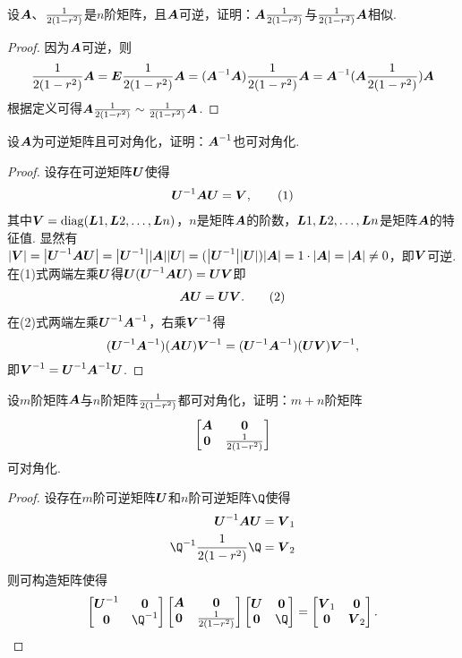 \begin{example}
设\(\boldsymbol{A}\)、\(\frac{1}{2(1-r^2)}\)是\(n\)阶矩阵，且\(\boldsymbol{A}\)可逆，证明：\(\boldsymbol{A}\frac{1}{2(1-r^2)}\)与\(\frac{1}{2(1-r^2)}\boldsymbol{A}\)相似.
\begin{proof}
因为\(\boldsymbol{A}\)可逆，则\[
\frac{1}{2(1-r^2)}\boldsymbol{A}
=\boldsymbol{E}\frac{1}{2(1-r^2)}\boldsymbol{A}
=(\boldsymbol{A}^{-1}\boldsymbol{A})\frac{1}{2(1-r^2)}\boldsymbol{A}
=\boldsymbol{A}^{-1}(\boldsymbol{A}\frac{1}{2(1-r^2)})\boldsymbol{A}
\]根据定义可得\(\boldsymbol{A}\frac{1}{2(1-r^2)} \sim \frac{1}{2(1-r^2)}\boldsymbol{A}\).
\end{proof}
\end{example}

\begin{example}
设\(\boldsymbol{A}\)为可逆矩阵且可对角化，证明：\(\boldsymbol{A}^{-1}\)也可对角化.
\begin{proof}
设存在可逆矩阵\(\P\)使得\begin{gather}
\P^{-1}\A\P = \V, \tag1
\end{gather}其中\(\boldsymbol{V}=\operatorname{diag}(\boldsymbol{L}{1},\boldsymbol{L}{2},\dotsc,\boldsymbol{L}{n})\)，\(n\)是矩阵\(\boldsymbol{A}\)的阶数，\(\boldsymbol{L}{1},\boldsymbol{L}{2},\dotsc,\boldsymbol{L}{n}\)是矩阵\(\boldsymbol{A}\)的特征值.
显然有\(\abs{\V} = \abs{\P^{-1}\A\P} = \abs{\P^{-1}}\abs{\A}\abs{\P} = (\abs{\P^{-1}}\abs{\P})\abs{\A} = 1 \cdot \abs{\A} = \abs{\A} \neq 0\)，即\(\boldsymbol{V}\)可逆.
在(1)式两端左乘\(\P\)得\(\P(\P^{-1}\A\P) = \P\V\)即\begin{gather}
\A\P = \P\V. \tag2
\end{gather}
在(2)式两端左乘\(\P^{-1}\A^{-1}\)，右乘\(\boldsymbol{V}^{-1}\)得\[
(\P^{-1}\A^{-1})(\A\P)\V^{-1} = (\P^{-1}\A^{-1})(\P\V)\V^{-1},
\]即\(\V^{-1} = \P^{-1}\A^{-1}\P\).
\end{proof}
\end{example}

\begin{example}
设\(m\)阶矩阵\(\boldsymbol{A}\)与\(n\)阶矩阵\(\frac{1}{2(1-r^2)}\)都可对角化，证明：\(m+n\)阶矩阵\[
\begin{bmatrix} \boldsymbol{A} & \boldsymbol{0} \\ \boldsymbol{0} & \frac{1}{2(1-r^2)} \end{bmatrix}
\]可对角化.
\begin{proof}
设存在\(m\)阶可逆矩阵\(\P\)和\(n\)阶可逆矩阵\(\Q\)使得\begin{align*}
\P^{-1}\A\P &= \V_1 \\
\Q^{-1}\B\Q &= \V_2
\end{align*}则可构造矩阵使得\[
\begin{bmatrix}
\P^{-1} & \z \\
\z & \Q^{-1}
\end{bmatrix}
\begin{bmatrix} \A & \z \\ \z & \B \end{bmatrix}
\begin{bmatrix}
\P & \z \\
\z & \Q
\end{bmatrix}
=
\begin{bmatrix}
\V_1 & \z \\
\z & \V_2
\end{bmatrix}.
\qedhere
\]
\end{proof}
\end{example}

